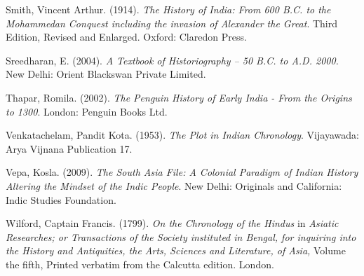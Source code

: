 \begin{thebibliography}{99}
  Smith, Vincent Arthur. (1914). \textit{The History of India: From 600 B.C. to the Mohammedan Conquest including the invasion of Alexander the Great}. Third Edition, Revised and Enlarged. Oxford: Claredon Press.

  Sreedharan, E. (2004). \textit{A Textbook of Historiography – 50 B.C. to A.D. 2000.} New Delhi: Orient Blackswan Private Limited.

  Thapar, Romila. (2002). \textit{The Penguin History of Early India - From the Origins to 1300}. London: Penguin Books Ltd.

  Venkatachelam, Pandit Kota. (1953). \textit{The Plot in Indian Chronology}. Vijayawada: Arya Vijnana Publication 17.

  Vepa, Kosla. (2009). \textit{The South Asia File: A Colonial Paradigm of Indian History Altering the Mindset of the Indic People}. New Delhi: Originals and California: Indic Studies Foundation.

  Wilford, Captain Francis. (1799). \textit{On the Chronology of the Hindus} in \textit{Asiatic Researches; or Transactions of the Society instituted in Bengal, for inquiring into the History and Antiquities, the Arts, Sciences and Literature, of Asia,} Volume the fifth, Printed verbatim from the Calcutta edition. London.
 
 \end{thebibliography}

\theendnotes

\label{chapter1-end}
